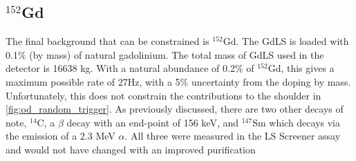 






\subsection{${}^{152}$Gd}
\par
The final background that can be constrained is ${}^{152}$Gd.
The GdLS is loaded with 0.1\% (by mass) of natural gadolinium.
The total mass of GdLS used in the detector is 16638 kg.
With a natural abundance of 0.2\% of ${}^{152}$Gd, this gives a maximum possible rate of 27Hz, with a 5\% uncertainty from the doping by mass.
Unfortunately, this does not constrain the contributions to the shoulder in \autoref{fig:od_random_trigger}.
As previously discussed, there are two other decays of note, ${}^{14}$C, a $\beta$ decay with an end-point of 156 keV, and ${}^{147}$Sm which decays via the emission of a 2.3 MeV $\alpha$.
All three were measured in the LS Screener assay and would not have changed with an improved purification \cite{scotthaselschwardt_thesis_ref}


